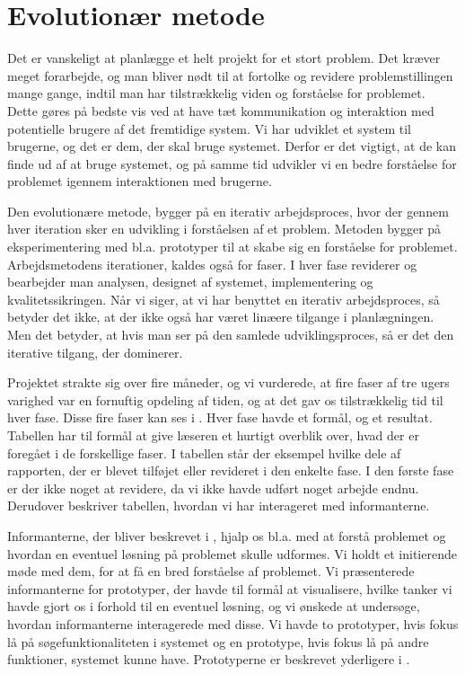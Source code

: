 \section{Evolutionær metode}
\label{sec:evolution}

Det er vanskeligt at planlægge et helt projekt for et stort problem. Det kræver meget forarbejde, og man bliver nødt til at fortolke og revidere problemstillingen mange gange, indtil man har tilstrækkelig viden og forståelse for problemet. Dette gøres på bedste vis ved at have tæt kommunikation og interaktion med potentielle brugere af det fremtidige system. Vi har udviklet et system til brugerne, og det er dem, der skal bruge systemet. Derfor er det vigtigt, at de kan finde ud af at bruge systemet, og på samme tid udvikler vi en bedre forståelse for problemet igennem interaktionen med brugerne. 

Den evolutionære metode, bygger på en iterativ arbejdsproces, hvor der gennem hver iteration sker en udvikling i forståelsen af et problem. Metoden bygger på eksperimentering med bl.a. prototyper til at skabe sig en forståelse for problemet. Arbejdsmetodens iterationer, kaldes også for faser. I hver fase reviderer og bearbejder man analysen, designet af systemet, implementering og kvalitetssikringen. \cite{cic} Når vi siger, at vi har benyttet en iterativ arbejdsproces, så betyder det ikke, at der ikke også har været linæere tilgange i planlægningen. Men det betyder, at hvis man ser på den samlede udviklingsproces, så er det den iterative tilgang, der dominerer.

Projektet strakte sig over fire måneder, og vi vurderede, at fire faser af tre ugers varighed var en fornuftig opdeling af tiden, og at det gav os tilstrækkelig tid til hver fase. Disse fire faser kan ses i . Hver fase havde et formål, og et resultat. Tabellen har til formål at give læseren et hurtigt overblik over, hvad der er foregået i de forskellige faser. I tabellen står der eksempel hvilke dele af rapporten, der er blevet tilføjet eller revideret i den enkelte fase. I den første fase er der ikke noget at revidere, da vi ikke havde udført noget arbejde endnu. Derudover beskriver tabellen, hvordan vi har interageret med informanterne.

Informanterne, der bliver beskrevet i , hjalp os bl.a. med at forstå problemet og hvordan en eventuel løsning på problemet skulle udformes. Vi holdt et initierende møde med dem, for at få en bred forståelse af problemet. Vi præsenterede informanterne for prototyper, der havde til formål at visualisere, hvilke tanker vi havde gjort os i forhold til en eventuel løsning, og vi ønskede at undersøge, hvordan informanterne interagerede med disse. Vi havde to prototyper, hvis fokus lå på søgefunktionaliteten i systemet og en prototype, hvis fokus lå på andre funktioner, systemet kunne have. Prototyperne er beskrevet yderligere i . 



